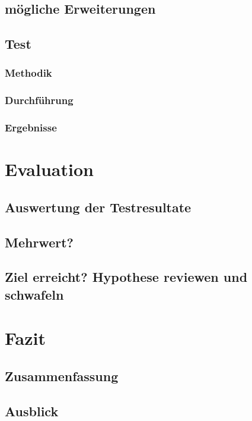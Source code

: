 \documentclass[12pt]{report}
\begin{document}
\section{mögliche Erweiterungen}
\section{Test}
\subsection{Methodik}
\subsection{Durchführung}
\subsection{Ergebnisse}
\chapter{Evaluation}
\section{Auswertung der Testresultate}
\section{Mehrwert?}
\section{Ziel erreicht? Hypothese reviewen und schwafeln}
\chapter{Fazit}
\section{Zusammenfassung}
\section{Ausblick}


\newpage
\begin{thebibliography}{20}

\end{thebibliography}
\end{document}
